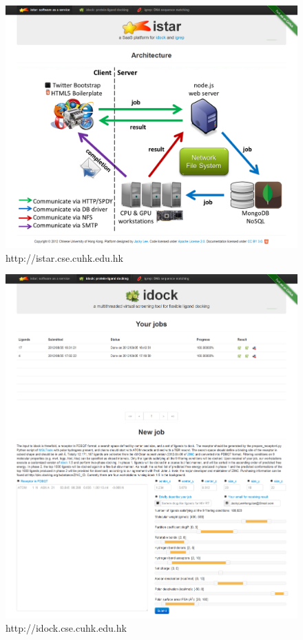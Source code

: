 \begin{figure}
\centering
\includegraphics[width=\linewidth]{istar/istar.png}
\caption{http://istar.cse.cuhk.edu.hk}
\label{istar:istar}
\end{figure}

\begin{figure}
\centering
\includegraphics[width=\linewidth]{istar/idock.png}
\caption{http://idock.cse.cuhk.edu.hk}
\label{istar:idock}
\end{figure}

